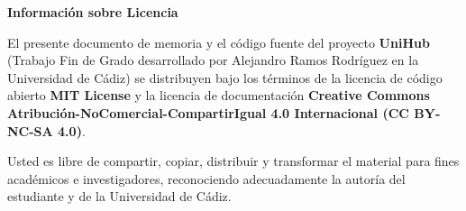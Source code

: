 
\begin{center}
\textbf{\Large Información sobre Licencia}
\end{center}

\vspace{1cm}

El presente documento de memoria y el código fuente del proyecto \textbf{UniHub} (Trabajo Fin de Grado desarrollado por Alejandro Ramos Rodríguez en la Universidad de Cádiz) se distribuyen bajo los términos de la licencia de código abierto \textbf{MIT License} y la licencia de documentación \textbf{Creative Commons Atribución-NoComercial-CompartirIgual 4.0 Internacional (CC BY-NC-SA 4.0)}.

Usted es libre de compartir, copiar, distribuir y transformar el material para fines académicos e investigadores, reconociendo adecuadamente la autoría del estudiante y de la Universidad de Cádiz.
